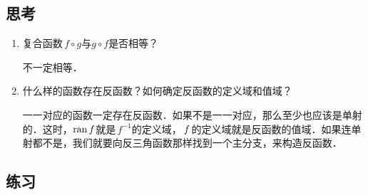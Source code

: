 \subsection*{思考}

\begin{enumerate}
\item 复合函数\(\,f \circ g\)与\(g \circ f\)是否相等？

  \ifshowsolp
    不一定相等．
  \fi

\item 什么样的函数存在反函数？如何确定反函数的定义域和值域？

  \ifshowsolp
    一一对应的函数一定存在反函数．如果不是一一对应，那么至少也应该是单射的．这时，\(\operatorname{ran} f\)就是\(\,f^{-1}\)的定义域，\(\,f\mkern2mu\)的定义域就是反函数的值域．如果连单射都不是，我们就要向反三角函数那样找到一个主分支，来构造反函数．
  \fi
\end{enumerate}

\ifshowex
{}
\subsection*{练习}

